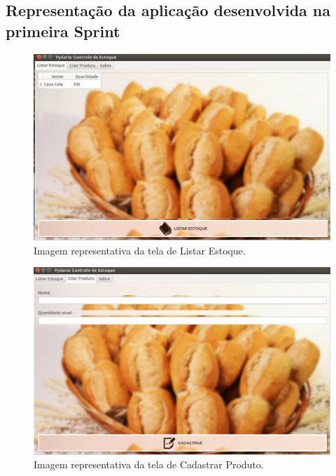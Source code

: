 \begin{appendices}
\chapter{Representação da aplicação desenvolvida na primeira Sprint}

\begin{figure}[!htpb]
\centering
\includegraphics[scale=0.45]{figuras/maturidade/foto_10_}
\caption{Imagem representativa da tela de Listar Estoque.}
\end{figure}

\begin{figure}[!htpb]
\centering
\includegraphics[scale=0.45]{figuras/maturidade/foto_11_}
\caption{Imagem representativa da tela de Cadastrar Produto.}
\end{figure}



\end{appendices}